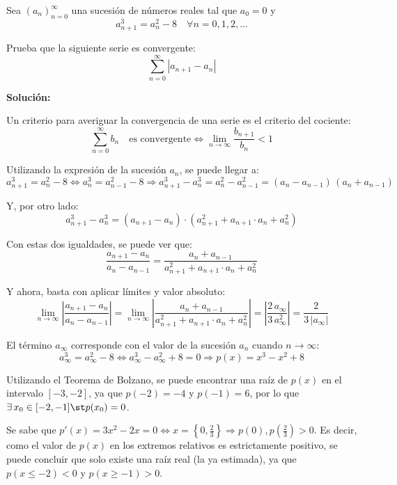 \documentclass[../../main.tex]{subfiles}
\begin{document}
  \begin{shaded}
  Sea $(a_n)_{n = 0}^\infty$ una sucesión de números reales tal que $a_0 = 0$ y
  $$
  a_{n + 1}^3 = a_n^2 - 8 \quad \forall n = 0, 1, 2, ...
  $$

  Prueba que la siguiente serie es convergente:
  $$
  \sum_{n = 0}^\infty |a_{n + 1} - a_n|
  $$
  \end{shaded}

  \textbf{Solución:}

  Un criterio para averiguar la convergencia de una serie es el criterio del cociente:
  $$
  \sum_{n = 0}^\infty b_n \quad \text{es convergente} \iff \lim_{n \to \infty} \frac{b_{n + 1}}{b_n} < 1
  $$

  Utilizando la expresión de la sucesión $a_n$, se puede llegar a:
  $$
  a_{n + 1}^3 = a_n^2 - 8 \iff a_n^3 = a_{n - 1}^2 - 8 \Longrightarrow a_{n + 1}^3 - a_n^3 = a_n^2 - a_{n - 1}^2 = (a_n - a_{n - 1}) \, (a_n + a_{n - 1})
  $$

  Y, por otro lado:
  $$
  a_{n + 1}^3 - a_n^3 = (a_{n + 1} - a_n) \cdot (a_{n + 1}^2 + a_{n + 1} \cdot a_n + a_n^2)
  $$

  Con estas dos igualdades, se puede ver que:
  $$
  \frac{a_{n + 1} - a_n}{a_n - a_{n - 1}}
  =
  \frac{a_n + a_{n - 1}}{a_{n + 1}^2 + a_{n + 1} \cdot a_n + a_n^2}
  $$

  Y ahora, basta con aplicar límites y valor absoluto:
  $$
  \lim_{n \to \infty} \left| \frac{a_{n + 1} - a_n}{a_n - a_{n - 1}} \right|
  =
  \lim_{n \to \infty} \left| \frac{a_n + a_{n - 1}}{a_{n + 1}^2 + a_{n + 1} \cdot a_n + a_n^2} \right|
  =
  \left|\frac{2 \, a_\infty}{3 \, a_\infty^2}\right| = \frac{2}{3\,|a_\infty|}
  $$

  El término $a_\infty$ corresponde con el valor de la sucesión $a_n$ cuando $n \to \infty$:
  $$
  a_\infty^3 = a_\infty^2 - 8 \iff a_\infty^3 - a_\infty^2 + 8 = 0 \Longrightarrow p(x) = x^3 - x^2 + 8
  $$

  Utilizando el Teorema de Bolzano, se puede encontrar una raíz de $p(x)$ en el intervalo $[-3, -2]$, ya que $p(-2) = -4$ y $p(-1) = 6$, por lo que $\exists \, x_0 \in [-2, -1] \st p(x_0) = 0$.

  Se sabe que $p'(x) = 3x^2 - 2x = 0 \iff x = \left\{0, \displaystyle\frac{2}{3}\right\} \Longrightarrow p(0), p\left(\displaystyle\frac{2}{3}\right) > 0$. Es decir, como el valor de $p(x)$ en los extremos relativos es estrictamente positivo, se puede concluir que solo existe una raíz real (la ya estimada), ya que $p(x \leq -2) < 0$ y $p(x \geq -1) > 0$.
\end{document}
